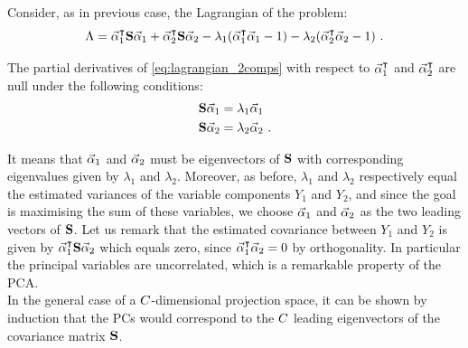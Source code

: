Consider, as in previous case, the Lagrangian of the problem:
\begin{equation}\label{eq:lagrangian_2comps}
\Lambda = \vec{\alpha}_1^\intercal \textbf{S} \vec{\alpha}_1 + \vec{\alpha}_2^\intercal\textbf{S} \vec{\alpha}_2 - \lambda_1(\vec{\alpha}_1^\intercal\vec{\alpha}_1 -1) - \lambda_2(\vec{\alpha}_2^\intercal\vec{\alpha}_2 -1) \mbox{ .}
\end{equation}

The partial derivatives of \eqref{eq:lagrangian_2comps} with respect to $\vec{\alpha}_1^\intercal$ and $\vec{\alpha}_2^\intercal$ are null under the following conditions:
\begin{align}
\textbf{S}  \vec{\alpha}_1 &= \lambda_1\vec{\alpha}_1 \\
\textbf{S}  \vec{\alpha}_2 &= \lambda_2\vec{\alpha}_2 \mbox{ .}
\end{align}

It means that $\vec{\alpha}_1$ and $\vec{\alpha}_2$ must be eigenvectors of $\textbf{S}$ with corresponding eigenvalues given by $\lambda_1$ and $\lambda_2$. Moreover, as before, $\lambda_1$ and $\lambda_2$ respectively equal the estimated variances of the variable components $Y_1$ and $Y_2$, and since the goal is maximising the sum of these variables, we choose $\vec{\alpha}_1$ and $\vec{\alpha}_2$ as the two leading vectors of $\textbf{S}$. Let us remark that the estimated covariance between $Y_1$ and $Y_2$ is given by $\vec{\alpha}_1^\intercal\textbf{S} \vec{\alpha}_2$ which equals zero, since $\vec{\alpha}_1^\intercal\vec{\alpha}_2 = 0$ by orthogonality. In particular the principal variables are uncorrelated, which is a remarkable property of the PCA. \\

In the general case of a $C$-dimensional projection space, it can be shown by induction that the PCs would correspond to the $C$ leading eigenvectors of the covariance matrix $\textbf{S}$.



